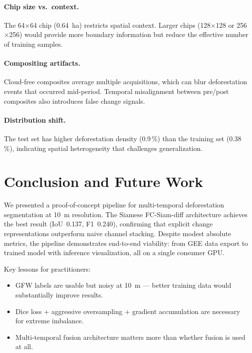 \documentclass[10pt,a4paper,onecolumn]{article}
\begin{document}
\paragraph{Chip size vs.\ context.}
The 64$\times$64 chip (0.64~ha) restricts spatial context.  Larger
chips (128$\times$128 or 256$\times$256) would provide more
boundary information but reduce the effective number of training
samples.

\paragraph{Compositing artifacts.}
Cloud-free composites average multiple acquisitions, which can blur
deforestation events that occurred mid-period.  Temporal
misalignment between pre/post composites also introduces false
change signals.

\paragraph{Distribution shift.}
The test set has higher deforestation density (0.9\,\%) than the
training set (0.38\,\%), indicating spatial heterogeneity that
challenges generalization.

\section{Conclusion and Future Work}

We presented a proof-of-concept pipeline for multi-temporal
deforestation segmentation at 10~m resolution.  The Siamese
FC-Siam-diff architecture achieves the best result (IoU~0.137,
F1~0.240), confirming that explicit change representations outperform
naive channel stacking.  Despite modest absolute metrics, the
pipeline demonstrates end-to-end viability: from GEE data export to
trained model with inference visualization, all on a single consumer
GPU.

Key lessons for practitioners:
\begin{itemize}[nosep]
    \item GFW labels are usable but noisy at 10~m --- better
          training data would substantially improve results.
    \item Dice loss + aggressive oversampling + gradient
          accumulation are necessary for extreme imbalance.
    \item Multi-temporal fusion architecture matters more than
          whether fusion is used at all.
\end{itemize}
\end{document}
